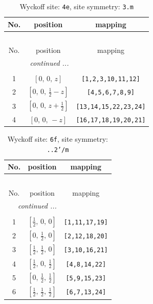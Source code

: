 \documentclass[fleqn,8pt]{jsarticle}
\begin{document}
\renewcommand{\arraystretch}{1.2}
\begin{longtable}{ccc}
\caption{Wyckoff site: {\tt 4e}, site symmetry: {\tt 3.m}}
 \\
 \hline \hline
No. & position & mapping \\ \hline \endfirsthead

\multicolumn{2}{l}{\tablename\ \thetable{}} \\
 \hline \hline
No. & position & mapping \\ \hline \endhead

 \hline \hline
\multicolumn{2}{r}{\footnotesize\it continued ...} \\ \endfoot

 \hline \hline
\multicolumn{2}{r}{} \\ \endlastfoot

1 & $\left[ 0,\, 0,\, z \right]$ & {\tt [1,2,3,10,11,12]} \\ \hline
2 & $\left[ 0,\, 0,\, \frac{1}{2} - z \right]$ & {\tt [4,5,6,7,8,9]} \\ \hline
3 & $\left[ 0,\, 0,\, z + \frac{1}{2} \right]$ & {\tt [13,14,15,22,23,24]} \\ \hline
4 & $\left[ 0,\, 0,\, - z \right]$ & {\tt [16,17,18,19,20,21]} \\
\end{longtable}
\renewcommand{\arraystretch}{1.2}
\begin{longtable}{ccc}
\caption{Wyckoff site: {\tt 6f}, site symmetry: {\tt ..2'/m}}
 \\
 \hline \hline
No. & position & mapping \\ \hline \endfirsthead

\multicolumn{2}{l}{\tablename\ \thetable{}} \\
 \hline \hline
No. & position & mapping \\ \hline \endhead

 \hline \hline
\multicolumn{2}{r}{\footnotesize\it continued ...} \\ \endfoot

 \hline \hline
\multicolumn{2}{r}{} \\ \endlastfoot

1 & $\left[ \frac{1}{2},\, 0,\, 0 \right]$ & {\tt [1,11,17,19]} \\ \hline
2 & $\left[ 0,\, \frac{1}{2},\, 0 \right]$ & {\tt [2,12,18,20]} \\ \hline
3 & $\left[ \frac{1}{2},\, \frac{1}{2},\, 0 \right]$ & {\tt [3,10,16,21]} \\ \hline
4 & $\left[ \frac{1}{2},\, 0,\, \frac{1}{2} \right]$ & {\tt [4,8,14,22]} \\ \hline
5 & $\left[ 0,\, \frac{1}{2},\, \frac{1}{2} \right]$ & {\tt [5,9,15,23]} \\ \hline
6 & $\left[ \frac{1}{2},\, \frac{1}{2},\, \frac{1}{2} \right]$ & {\tt [6,7,13,24]} \\
\end{longtable}
\end{document}
